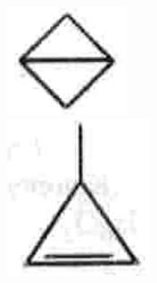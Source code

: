 \documentclass[10pt]{article}
\begin{document}
\includegraphics[max width=\textwidth, center]{2025_01_28_8470952b98110cec3aabg-039}\\
\includegraphics[max width=\textwidth, center]{2025_01_28_8470952b98110cec3aabg-039(3)}
\end{document}
